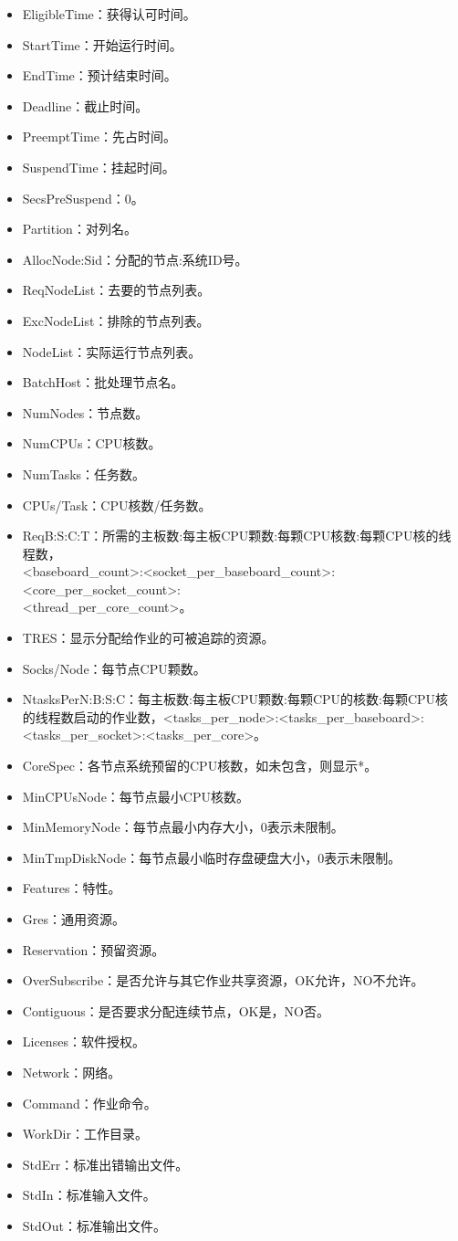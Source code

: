 \begin{itemize}
	\item EligibleTime：获得认可时间。
	\item StartTime：开始运行时间。
	\item EndTime：预计结束时间。
	\item Deadline：截止时间。
	\item PreemptTime：先占时间。
	\item SuspendTime：挂起时间。
	\item SecsPreSuspend：0。
	\item Partition：对列名。
	\item AllocNode:Sid：分配的节点:系统ID号。
	\item ReqNodeList：去要的节点列表。
	\item ExcNodeList：排除的节点列表。
	\item NodeList：实际运行节点列表。
	\item BatchHost：批处理节点名。
	\item NumNodes：节点数。
	\item NumCPUs：CPU核数。
	\item NumTasks：任务数。
	\item CPUs/Task：CPU核数/任务数。
	\item ReqB:S:C:T：所需的主板数:每主板CPU颗数:每颗CPU核数:每颗CPU核的线程数，\\<baseboard\_count>:<socket\_per\_baseboard\_count>:<core\_per\_socket\_count>:\\<thread\_per\_core\_count>。
	\item TRES：显示分配给作业的可被追踪的资源。
	\item Socks/Node：每节点CPU颗数。
	\item NtasksPerN:B:S:C：每主板数:每主板CPU颗数:每颗CPU的核数:每颗CPU核的线程数启动的作业数，<tasks\_per\_node>:<tasks\_per\_baseboard>:<tasks\_per\_socket>:<tasks\_per\_core>。
	\item CoreSpec：各节点系统预留的CPU核数，如未包含，则显示*。
	\item MinCPUsNode：每节点最小CPU核数。
	\item MinMemoryNode：每节点最小内存大小，0表示未限制。
	\item MinTmpDiskNode：每节点最小临时存盘硬盘大小，0表示未限制。
	\item Features：特性。
	\item Gres：通用资源。
	\item Reservation：预留资源。
	\item OverSubscribe：是否允许与其它作业共享资源，OK允许，NO不允许。
	\item Contiguous：是否要求分配连续节点，OK是，NO否。
	\item Licenses：软件授权。
	\item Network：网络。
	\item Command：作业命令。
	\item WorkDir：工作目录。
	\item StdErr：标准出错输出文件。
	\item StdIn：标准输入文件。
	\item StdOut：标准输出文件。
\end{itemize}

